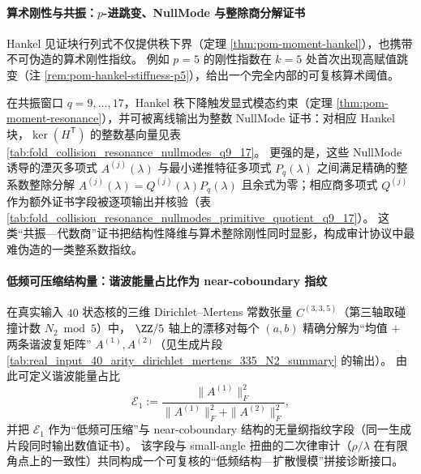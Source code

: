 \paragraph{算术刚性与共振：\texorpdfstring{$p$}{p}-进跳变、NullMode 与整除商分解证书}
Hankel 见证块行列式不仅提供秩下界（定理 \ref{thm:pom-moment-hankel}），也携带不可伪造的算术刚性指纹。
例如 \(p=5\) 的刚性指数在 \(k=5\) 处首次出现高赋值跳变（注 \ref{rem:pom-hankel-stiffness-p5}），给出一个完全内部的可复核算术阈值。
\par
在共振窗口 \(q=9,\dots,17\)，Hankel 秩下降触发显式模态约束（定理 \ref{thm:pom-moment-resonance}），并可被离线输出为整数 NullMode 证书：对相应 Hankel 块，\(\ker(H^{\mathsf T})\) 的整数基向量见表 \ref{tab:fold_collision_resonance_nullmodes_q9_17}。
更强的是，这些 NullMode 诱导的湮灭多项式 \(A^{(j)}(\lambda)\) 与最小递推特征多项式 \(P_q(\lambda)\) 之间满足精确的整系数整除分解
\(
A^{(j)}(\lambda)=Q^{(j)}(\lambda)P_q(\lambda)
\)
且余式为零；相应商多项式 \(Q^{(j)}\) 作为额外证书字段被逐项输出并核验（表 \ref{tab:fold_collision_resonance_nullmodes_primitive_quotient_q9_17}）。
这类“共振—代数商”证书把结构性降维与算术整除刚性同时显影，构成审计协议中最难伪造的一类整系数指纹。

\paragraph{低频可压缩结构量：谐波能量占比作为 near-coboundary 指纹}
在真实输入 \(40\) 状态核的三维 Dirichlet--Mertens 常数张量 \(C^{(3,3,5)}\)（第三轴取碰撞计数 \(N_2\bmod 5\)）中，
\(\ZZ/5\) 轴上的漂移对每个 \((a,b)\) 精确分解为“均值 \(+\) 两条谐波复矩阵” \(A^{(1)},A^{(2)}\)（见生成片段 \ref{tab:real_input_40_arity_dirichlet_mertens_335_N2_summary} 的输出）。
由此可定义谐波能量占比
\[
\mathcal{E}_1:=\frac{\|A^{(1)}\|_F^2}{\|A^{(1)}\|_F^2+\|A^{(2)}\|_F^2},
\]
并把 \(\mathcal{E}_1\) 作为“低频可压缩”与 near-coboundary 结构的无量纲指纹字段（同一生成片段同时输出数值证书）。
该字段与 small-angle 扭曲的二次律审计（\(\rho/\lambda\) 在有限角点上的一致性）共同构成一个可复核的“低频结构—扩散慢模”拼接诊断接口。

